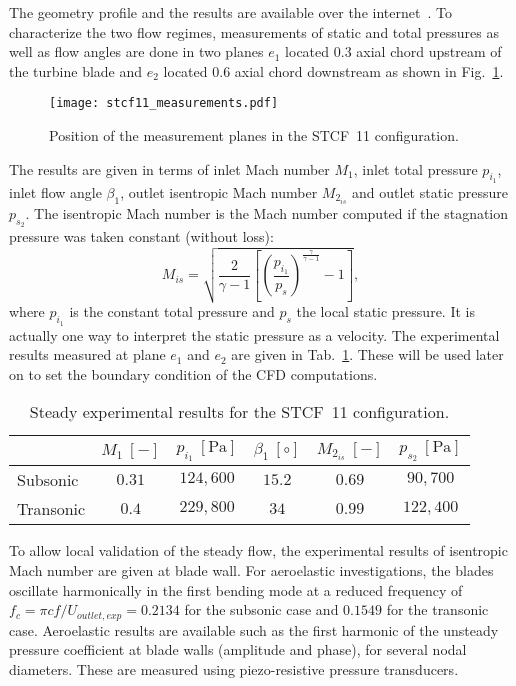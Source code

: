 The geometry profile and the results are available over the
internet~\cite{stcf11web}. 
To characterize the two flow regimes, measurements of static and total pressures 
as well as flow angles are done in two planes $e_1$ located $0.3$ axial chord upstream 
of the turbine
blade and $e_2$ located $0.6$ axial chord downstream
as shown in Fig.~\ref{fig:stcf11_measurements}.
\begin{figure}[htp]
  \centering
  \texttt{[image: stcf11\_measurements.pdf]}
  \caption{Position of the measurement planes in the STCF~11 configuration.}
  \label{fig:stcf11_measurements}
\end{figure}
The results are given in terms of
inlet Mach number $M_1$, inlet total pressure $p_{i_1}$, 
inlet flow angle $\beta_1$, outlet isentropic
Mach number $M_{2_{is}}$ and outlet static pressure $p_{s_2}$. 
The isentropic Mach number is the Mach number 
computed if the stagnation pressure was taken constant (without loss):
\begin{equation}
    M_{is} = \sqrt{\frac{2}{\gamma -1}
        \left[\left( \frac{p_{i_1}}{p_s} \right)^{\frac{\gamma}{\gamma -1}}  
        - 1 \right]},
\end{equation}
where $p_{i_1}$ is the constant total pressure and $p_s$
the local static pressure.
It is actually
one way to interpret the static pressure as a velocity.
The experimental results measured at plane $e_1$
and $e_2$ are given in Tab.~\ref{tab:stcf11_steady_results}. 
These will be used later on to set the boundary condition 
of the CFD computations.
\begin{table}[htp]
   \centering
  \begin{tabular}{lccccc}
    \toprule
    \phantom{abdefghijk}& $M_1~[-]$ & $p_{i_1}~[\text{Pa}]$ & $\beta_1~[\circ]$ & $M_{2_{is}}~[-]$ & $p_{s_2}~[\text{Pa}]$ \\
    \midrule
    Subsonic & $0.31$ & $124,600$ & $15.2$ & $0.69$  & $90,700$ \\
    Transonic & $0.4$ & $229,800$ & $34$    & $0.99$ & $122,400$ \\
    \bottomrule
  \end{tabular}
  \caption{Steady experimental results for the STCF~11 configuration.}
  \label{tab:stcf11_steady_results}
\end{table} 

To allow local validation of the steady
flow, the experimental results of 
isentropic Mach number are given at blade wall.
For aeroelastic investigations, the blades oscillate harmonically in the first bending mode
at a reduced frequency of $f_{c} =\pi c f/U_{outlet, exp} = 0.2134$ 
for the subsonic case and $0.1549$ for the
transonic case. Aeroelastic
results are available such as the first harmonic of the unsteady pressure
coefficient at blade walls (amplitude and phase), for several nodal
diameters. These are measured using piezo-resistive pressure transducers.

